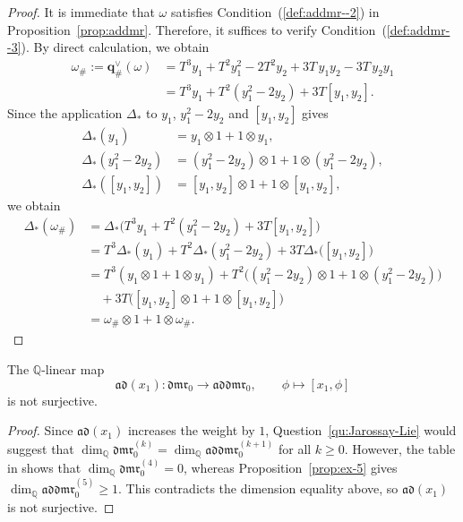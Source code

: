 \documentclass[15pt,oneside,reqno]{amsart}
\theoremstyle{remark}{
\newtheorem{lem}[df]{Lemma}
\newtheorem{prop}[df]{Proposition}
\newtheorem{ex}[df]{Example}
\newtheorem{rmk}[df]{Remark}
}
\newcommand{\Q}{\mathbb{Q}}
\newcommand{\dmr}{\mathfrak{dmr}}
\newcommand{\addmr}{\mathfrak{addmr}}
\newcommand{\ad}{\mathfrak{ad}}
\begin{document}
\begin{proof}
It is immediate that $\omega$ satisfies Condition~(\ref{def:addmr--2}) in Proposition~\ref{prop:addmr}.
Therefore, it suffices to verify Condition~(\ref{def:addmr--3}).
By direct calculation, we obtain
\begin{align*}
\omega_{\#} := \mathbf{q}_{\#}^{\vee}(\omega)
&= T^3y_1 + T^2y_1^2 - 2T^2y_2 + 3T\,y_1y_2 - 3T\,y_2y_1\\
&= T^3 y_1 + T^2 (y_1^2 - 2y_2) + 3T [y_1,y_2].
\end{align*}
Since the application $\Delta_*$ to $y_1$, $y_1^2 - 2y_2$ and $[y_1,y_2]$ gives
\begin{align*}
\Delta_*(y_1) &= y_1 \otimes 1 + 1\otimes y_1,\\
\Delta_*(y_1^2 - 2y_2) &= (y_1^2 - 2y_2) \otimes 1 + 1\otimes (y_1^2 - 2y_2),\\
\Delta_*([y_1,y_2]) &= [y_1,y_2] \otimes 1 + 1\otimes [y_1,y_2],
\end{align*}
we obtain
\begin{align*}
\Delta_*(\omega_{\#})
&= \Delta_*\bigl(T^3 y_1 + T^2 (y_1^2 - 2y_2) + 3T [y_1,y_2]\bigr)\\
&= T^3\Delta_*(y_1) + T^2\Delta_*(y_1^2 - 2y_2) + 3T\Delta_*\bigl([y_1,y_2]\bigr)\\
&= T^3(y_1 \otimes 1 + 1\otimes y_1)
 + T^2\bigl((y_1^2 - 2y_2)\otimes 1 + 1\otimes (y_1^2 - 2y_2)\bigr)\\
&\quad + 3T\bigl([y_1,y_2]\otimes 1 + 1\otimes [y_1,y_2]\bigr)\\
&= \omega_{\#} \otimes 1 + 1\otimes \omega_{\#}.
\end{align*}
\end{proof}



\begin{prop}
The $\Q$-linear map
\[
\ad(x_1)\colon \dmr_0\longrightarrow \addmr_0,\qquad
\phi \longmapsto [x_1,\phi]
\]
is not surjective.
\end{prop}

\begin{proof}
Since $\ad(x_1)$ increases the weight by $1$, Question~\ref{qu:Jarossay-Lie} would suggest that
$\dim_{\Q}\dmr_0^{(k)}=\dim_{\Q}\addmr_0^{(k+1)}$ for all $k\ge 0$.
However, the table in \cite[pp.5]{Schneps-ds} shows that $\dim_{\Q}\dmr_0^{(4)}=0$, whereas Proposition~\ref{prop:ex-5} gives $\dim_{\Q}\addmr_0^{(5)}\ge 1$.
This contradicts the dimension equality above, so $\ad(x_1)$ is not surjective.
\end{proof}
\end{document}
